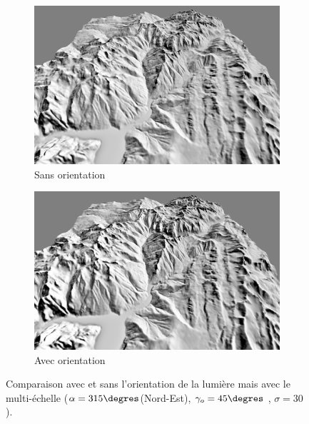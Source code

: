 \begin{figure}[h!]
\centering
 \begin{subfigure}[t]{0.49\linewidth}
   \centering
   \includegraphics[width=1.0\linewidth]{Resultats/5_our_nonorien.png}
   \caption{Sans orientation}
 \end{subfigure}
 \begin{subfigure}[t]{0.49\linewidth}
   \centering
   \includegraphics[width=1.0\linewidth]{Resultats/5_our_orien.png}
   \caption{Avec orientation}
 \end{subfigure}
 \caption{Comparaison avec et sans l'orientation de la lumière mais avec le multi-échelle ($\alpha = 315\degres$(Nord-Est), $\gamma_o = 45\degres$ , $\sigma = 30$).}
\end{figure}

